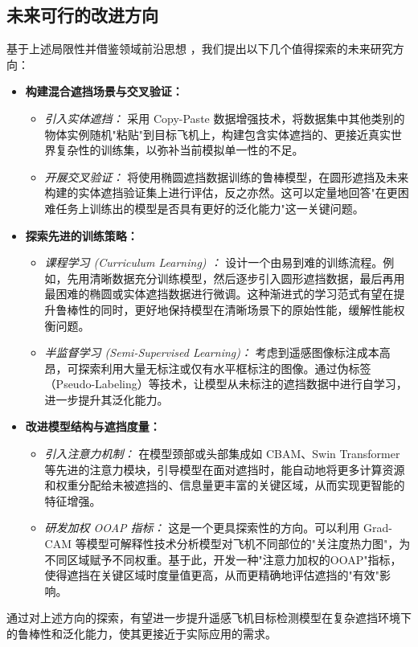 \documentclass[12pt, a4paper]{report}
\begin{document}
\subsection{未来可行的改进方向}
基于上述局限性并借鉴领域前沿思想 \cite{wang2023survey}，我们提出以下几个值得探索的未来研究方向：
\begin{itemize}
    \item \textbf{构建混合遮挡场景与交叉验证：}
    \begin{itemize}
        \item \textit{引入实体遮挡：} 采用 Copy-Paste 数据增强技术，将数据集中其他类别的物体实例随机"粘贴"到目标飞机上，构建包含实体遮挡的、更接近真实世界复杂性的训练集，以弥补当前模拟单一性的不足。
        \item \textit{开展交叉验证：} 将使用椭圆遮挡数据训练的鲁棒模型，在圆形遮挡及未来构建的实体遮挡验证集上进行评估，反之亦然。这可以定量地回答"在更困难任务上训练出的模型是否具有更好的泛化能力"这一关键问题。
    \end{itemize}
    \item \textbf{探索先进的训练策略：}
    \begin{itemize}
        \item \textit{课程学习 (Curriculum Learning) \cite{curriculumlearning}：} 设计一个由易到难的训练流程。例如，先用清晰数据充分训练模型，然后逐步引入圆形遮挡数据，最后再用最困难的椭圆或实体遮挡数据进行微调。这种渐进式的学习范式有望在提升鲁棒性的同时，更好地保持模型在清晰场景下的原始性能，缓解性能权衡问题。
        \item \textit{半监督学习 (Semi-Supervised Learning)：} 考虑到遥感图像标注成本高昂，可探索利用大量无标注或仅有水平框标注的图像。通过伪标签（Pseudo-Labeling）等技术，让模型从未标注的遮挡数据中进行自学习，进一步提升其泛化能力。
    \end{itemize}
    \item \textbf{改进模型结构与遮挡度量：}
    \begin{itemize}
        \item \textit{引入注意力机制：} 在模型颈部或头部集成如 CBAM、Swin Transformer \cite{swintransformer} 等先进的注意力模块，引导模型在面对遮挡时，能自动地将更多计算资源和权重分配给未被遮挡的、信息量更丰富的关键区域，从而实现更智能的特征增强。
        \item \textit{研发加权 OOAP 指标：} 这是一个更具探索性的方向。可以利用 Grad-CAM 等模型可解释性技术分析模型对飞机不同部位的"关注度热力图"，为不同区域赋予不同权重。基于此，开发一种"注意力加权的OOAP"指标，使得遮挡在关键区域时度量值更高，从而更精确地评估遮挡的"有效"影响。
    \end{itemize}
\end{itemize}
通过对上述方向的探索，有望进一步提升遥感飞机目标检测模型在复杂遮挡环境下的鲁棒性和泛化能力，使其更接近于实际应用的需求。
\end{document}
